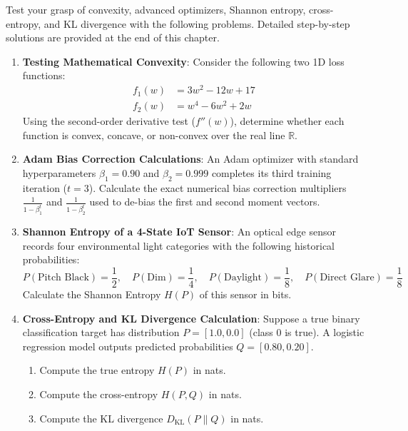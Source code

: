 Test your grasp of convexity, advanced optimizers, Shannon entropy, cross-entropy, and KL divergence with the following problems. Detailed step-by-step solutions are provided at the end of this chapter.

\begin{checkyourself}
\begin{enumerate}
    \item \textbf{Testing Mathematical Convexity}:
    Consider the following two 1D loss functions:
    \begin{align*}
    f_1(w) &= 3w^2 - 12w + 17 \\
    f_2(w) &= w^4 - 6w^2 + 2w
    \end{align*}
    Using the second-order derivative test ($f''(w)$), determine whether each function is convex, concave, or non-convex over the real line $\mathbb{R}$.

    \item \textbf{Adam Bias Correction Calculations}:
    An Adam optimizer with standard hyperparameters $\beta_1 = 0.90$ and $\beta_2 = 0.999$ completes its third training iteration ($t = 3$). 
    Calculate the exact numerical bias correction multipliers $\frac{1}{1 - \beta_1^t}$ and $\frac{1}{1 - \beta_2^t}$ used to de-bias the first and second moment vectors.

    \item \textbf{Shannon Entropy of a 4-State IoT Sensor}:
    An optical edge sensor records four environmental light categories with the following historical probabilities:
    \begin{equation*}
    P(\text{Pitch Black}) = \frac{1}{2}, \quad P(\text{Dim}) = \frac{1}{4}, \quad P(\text{Daylight}) = \frac{1}{8}, \quad P(\text{Direct Glare}) = \frac{1}{8}
    \end{equation*}
    Calculate the Shannon Entropy $H(P)$ of this sensor in bits.

    \item \textbf{Cross-Entropy and KL Divergence Calculation}:
    Suppose a true binary classification target has distribution $P = [1.0, 0.0]$ (class $0$ is true). A logistic regression model outputs predicted probabilities $Q = [0.80, 0.20]$.
    \begin{enumerate}[label=(\alph*)]
        \item Compute the true entropy $H(P)$ in nats.
        \item Compute the cross-entropy $H(P, Q)$ in nats.
        \item Compute the KL divergence $D_{\text{KL}}(P \parallel Q)$ in nats.
    \end{enumerate}


\end{enumerate}
\end{checkyourself}
